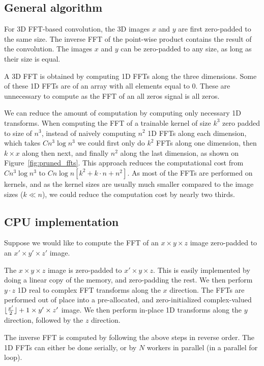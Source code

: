 \documentclass[conference]{./IEEEtran/IEEEtran}
\DeclarePairedDelimiter{\floor}{\lfloor}{\rfloor}
\begin{document}
  \subsection{General algorithm}

  For 3D FFT-based convolution, the 3D images $x$ and $y$ are first
  zero-padded to the same size.  The inverse FFT of the point-wise
  product contains the result of the convolution.  The images $x$ and
  $y$ can be zero-padded to any size, as long as their size is equal.

  A 3D FFT is obtained by computing 1D FFTs along the three
  dimensions.  Some of these 1D FFTs are of an array with all elements
  equal to $0$.  These are unnecessary to compute as the FFT of
  an all zeros signal is all zeros.

  We can reduce the amount of computation by computing only necessary
  1D transforms.  When computing the FFT of a trainable kernel of size
  $k^3$ zero padded to size of $n^3$, instead of naively computing
  $n^2$ 1D FFTs along each dimension, which takes $C n^3 \log n^3$ we
  could first only do $k^2$ FFTs along one dimension, then $k \times
  x$ along then next, and finally $n^2$ along the last dimension, as
  shown on Figure~\ref{fig:pruned_ffts}.  This approach reduces the
  computational cost from $C n^3 \log n^3$ to $C n\log n[k^2 + k \cdot
  n + n^2]$.  As most of the FFTs are performed on kernels, and as the
  kernel sizes are usually much smaller compared to the image sizes
  ($k \ll n$), we could reduce the computation cost by nearly two
  thirds.

  \subsection{CPU implementation}

  Suppose we would like to compute the FFT of an $x \times y \times z$
  image zero-padded to an $x' \times y' \times z'$ image.

  The $x \times y \times z$ image is zero-padded to $x' \times
  y \times z$.  This is easily implemented by doing a linear copy of
  the memory, and zero-padding the rest. We then perform $y \cdot z$
  1D real to complex FFT transforms along the $x$ direction.  The FFTs
  are performed out of place into a pre-allocated, and
  zero-initialized complex-valued $\floor{\frac{x'}{2}} + 1 \times
  y' \times z'$ image.  We then perform in-place 1D transforms along
  the $y$ direction, followed by the $z$ direction.

  The inverse FFT is computed by following the above steps in reverse
  order.  The 1D FFTs can either be done serially, or by $N$ workers
  in parallel (in a parallel for loop).
\end{document}
